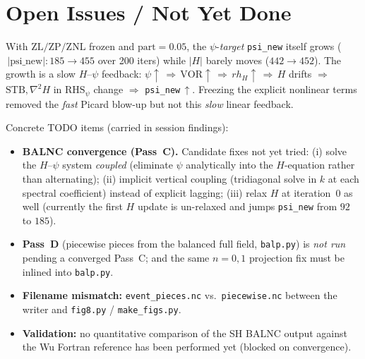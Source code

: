 \section{Open Issues / Not Yet Done}
\label{sec:wu_open}

\begin{warnbox}
With $\mathrm{ZL/ZP/ZNL}$ frozen and $\mathrm{part}=0.05$, the
$\psi$-\emph{target} \texttt{psi\_new} itself grows
($\,|\text{psi\_new}|:185\!\to\!455$ over 200 iters) while $|H|$ barely
moves ($442\!\to\!452$).  The growth is a slow $H$--$\psi$ feedback:
$\psi\!\uparrow\,\Rightarrow\,\mathrm{VOR}\!\uparrow\,\Rightarrow\,rh_H\!\uparrow\,\Rightarrow\,H$
drifts $\Rightarrow$ $\mathrm{STB},\nabla^2H$ in
$\text{RHS}_\psi$ change $\Rightarrow$ \texttt{psi\_new}$\,\uparrow$.
Freezing the explicit nonlinear terms removed the \emph{fast} Picard
blow-up but not this \emph{slow} linear feedback.
\end{warnbox}

\noindent Concrete TODO items (carried in session findings):
\begin{itemize}[leftmargin=1.4em]
\item \textbf{BALNC convergence (Pass~C).}  Candidate fixes not yet
  tried: (i) solve the $H$--$\psi$ system \emph{coupled} (eliminate
  $\psi$ analytically into the $H$-equation rather than alternating);
  (ii) implicit vertical coupling (tridiagonal solve in $k$ at each
  spectral coefficient) instead of explicit lagging; (iii) relax $H$ at
  iteration~0 as well (currently the first $H$ update is un-relaxed and
  jumps \texttt{psi\_new} from $92$ to $185$).
\item \textbf{Pass~D} (piecewise pieces from the balanced full field,
  \texttt{balp.py}) is \emph{not run} pending a converged Pass~C; and the
  same $n{=}0,1$ projection fix must be inlined into \texttt{balp.py}.
\item \textbf{Filename mismatch:} \texttt{event\_pieces.nc} vs.\
  \texttt{piecewise.nc} between the writer and \texttt{fig8.py} /
  \texttt{make\_figs.py}.
\item \textbf{Validation:} no quantitative comparison of the SH BALNC
  output against the Wu Fortran reference has been performed yet
  (blocked on convergence).
\end{itemize}

